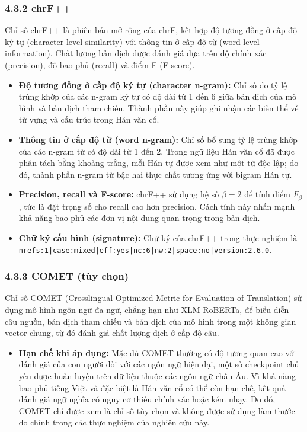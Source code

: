 \subsubsection{4.3.2 chrF++}
Chỉ số chrF++ là phiên bản mở rộng của chrF, kết hợp độ tương đồng ở cấp độ ký tự (character-level similarity) với thông tin ở cấp độ từ (word-level information). Chất lượng bản dịch được đánh giá dựa trên độ chính xác (precision), độ bao phủ (recall) và điểm F (F-score).
\begin{itemize}
    \item \textbf{Độ tương đồng ở cấp độ ký tự (character n-gram):} Chỉ số đo tỷ lệ trùng khớp của các n-gram ký tự có độ dài từ 1 đến 6 giữa bản dịch của mô hình và bản dịch tham chiếu. Thành phần này giúp ghi nhận các biến thể về từ vựng và cấu trúc trong Hán văn cổ.
    \item \textbf{Thông tin ở cấp độ từ (word n-gram):} Chỉ số bổ sung tỷ lệ trùng khớp của các n-gram từ có độ dài từ 1 đến 2. Trong ngữ liệu Hán văn cổ đã được phân tách bằng khoảng trắng, mỗi Hán tự được xem như một từ độc lập; do đó, thành phần n-gram từ bậc hai thực chất tương ứng với bigram Hán tự.
    \item \textbf{Precision, recall và F-score:} chrF++ sử dụng hệ số $\beta = 2$ để tính điểm $F_\beta$, tức là đặt trọng số cho recall cao hơn precision. Cách tính này nhấn mạnh khả năng bao phủ các đơn vị nội dung quan trọng trong bản dịch.
    \item \textbf{Chữ ký cấu hình (signature):} Chữ ký của chrF++ trong thực nghiệm là \texttt{nrefs:1|case:mixed|eff:yes|nc:6|nw:2|space:no|version:2.6.0}.
\end{itemize}

\subsubsection{4.3.3 COMET (tùy chọn)}
Chỉ số COMET (Crosslingual Optimized Metric for Evaluation of Translation) sử dụng mô hình ngôn ngữ đa ngữ, chẳng hạn như XLM-RoBERTa, để biểu diễn câu nguồn, bản dịch tham chiếu và bản dịch của mô hình trong một không gian vector chung, từ đó đánh giá chất lượng dịch ở cấp độ câu.
\begin{itemize}
    \item \textbf{Hạn chế khi áp dụng:} Mặc dù COMET thường có độ tương quan cao với đánh giá của con người đối với các ngôn ngữ hiện đại, một số checkpoint chủ yếu được huấn luyện trên dữ liệu thuộc các ngôn ngữ châu Âu. Vì khả năng bao phủ tiếng Việt và đặc biệt là Hán văn cổ có thể còn hạn chế, kết quả đánh giá ngữ nghĩa có nguy cơ thiếu chính xác hoặc kém nhạy. Do đó, COMET chỉ được xem là chỉ số tùy chọn và không được sử dụng làm thước đo chính trong các thực nghiệm của nghiên cứu này.
\end{itemize}

